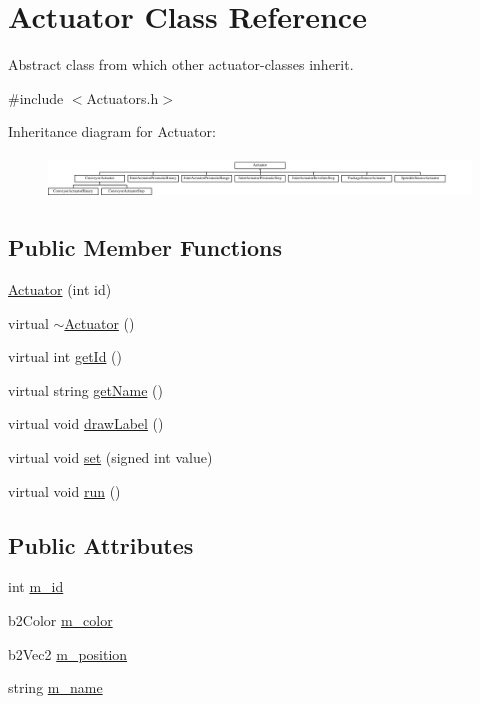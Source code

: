 \hypertarget{classActuator}{\section{Actuator Class Reference}
\label{classActuator}
}


Abstract class from which other actuator-\/classes inherit.  




{\ttfamily \#include $<$Actuators.\-h$>$}

Inheritance diagram for Actuator\-:\begin{figure}[H]
\begin{center}
\leavevmode
\includegraphics[height=1.147541cm]{classActuator}
\end{center}
\end{figure}
\subsection*{Public Member Functions}
\begin{DoxyCompactItemize}
\item 
\hyperlink{classActuator_a2f4022920c434cd6b3f78a749b60fbfe}{Actuator} (int id)
\item 
virtual \hyperlink{classActuator_ac9dda5313616de651431d103988f6c1b}{$\sim$\-Actuator} ()
\item 
virtual int \hyperlink{classActuator_aa97717414ddb932701fa8c882bc55773}{get\-Id} ()
\item 
virtual string \hyperlink{classActuator_a7d57e5b0684179fe527b7724897a0312}{get\-Name} ()
\item 
virtual void \hyperlink{classActuator_aaa39a438315ac34dbb1a4237bf70ff99}{draw\-Label} ()
\item 
virtual void \hyperlink{classActuator_a6281019cccd4034ab2cf7071defecf70}{set} (signed int value)
\item 
virtual void \hyperlink{classActuator_aabe48a4249a91a4cd1b964001fe754fc}{run} ()
\end{DoxyCompactItemize}
\subsection*{Public Attributes}
\begin{DoxyCompactItemize}
\item 
int \hyperlink{classActuator_aec2f761be4e82de74e986f02e5e77527}{m\-\_\-id}
\item 
b2\-Color \hyperlink{classActuator_ad534cbd18d6df7e5ab080b3628f5522d}{m\-\_\-color}
\item 
b2\-Vec2 \hyperlink{classActuator_ab7e8376ea5e795af2aad96c924253c77}{m\-\_\-position}
\item 
string \hyperlink{classActuator_a1664ca83d9352531527aa66c2f965b7b}{m\-\_\-name}
\end{DoxyCompactItemize}


